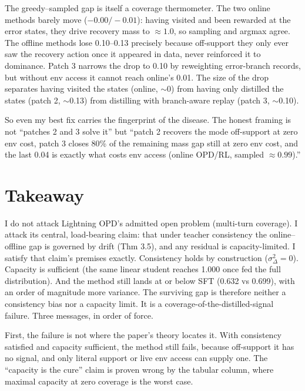 \documentclass[11pt]{article}
\begin{document}
The greedy--sampled gap is itself a coverage thermometer. The two
online methods barely move ($-0.00/-0.01$): having visited and been rewarded at
the error states, they drive recovery mass to $\approx 1.0$, so sampling and
argmax agree. The offline methods lose 0.10--0.13 precisely because off-support they
only ever saw the recovery action once it appeared in data, never reinforced it to
dominance. Patch 3 narrows the drop to 0.10 by reweighting error-branch records,
but without env access it cannot reach online's 0.01. The size of the drop separates
having visited the states (online, $\sim$0) from having only distilled the states
(patch 2, $\sim$0.13) from distilling with branch-aware replay (patch 3, $\sim$0.10).

So even my best fix carries the fingerprint of the disease. The honest framing is not
``patches 2 and 3 solve it'' but ``patch 2 recovers the mode off-support at zero env
cost, patch 3 closes 80\% of the remaining mass gap still at zero env cost, and the
last 0.04 is exactly what costs env access (online OPD/RL, sampled $\approx 0.99$).''

\section{Takeaway}
\label{sec:takeaway}

I do not attack Lightning OPD's admitted open problem (multi-turn coverage). I
attack its central, load-bearing claim: that under teacher consistency the
online--offline gap is governed by drift (Thm 3.5), and any residual is
capacity-limited. I satisfy that claim's premises exactly. Consistency holds by
construction ($\sigma_\Delta^2 = 0$). Capacity is sufficient (the same linear
student reaches 1.000 once fed the full distribution). And the method still lands at
or below SFT (0.632 vs 0.699), with an order of magnitude more variance. The
surviving gap is therefore neither a consistency bias nor a capacity limit. It is a
coverage-of-the-distilled-signal failure. Three messages, in order of force.

First, the failure is not where the paper's theory locates it. With
consistency satisfied and capacity sufficient, the method still fails, because
off-support it has no signal, and only literal support or live env access can
supply one. The ``capacity is the cure'' claim is proven wrong by the
tabular column, where maximal capacity at zero coverage is the worst case.
\end{document}
